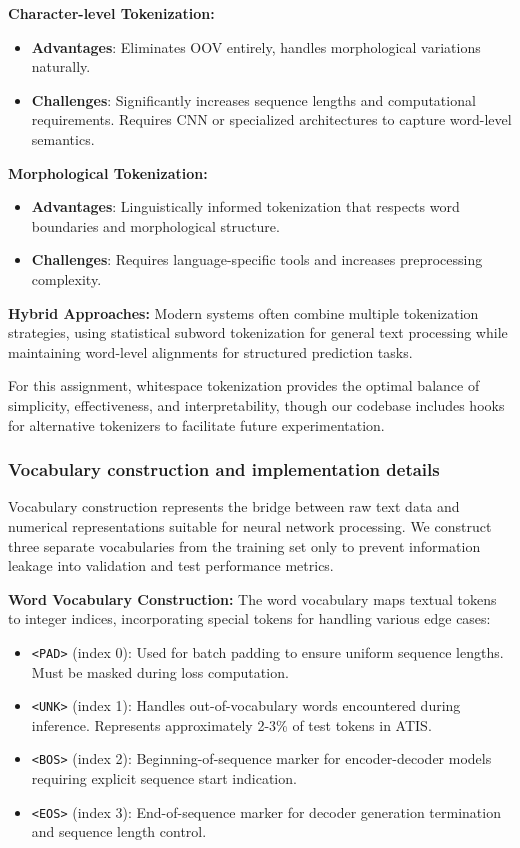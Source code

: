\documentclass[conference]{IEEEtran}
\begin{document}
\textbf{Character-level Tokenization:}
\begin{itemize}
  \item \textbf{Advantages}: Eliminates OOV entirely, handles morphological variations naturally.
  \item \textbf{Challenges}: Significantly increases sequence lengths and computational requirements. Requires CNN or specialized architectures to capture word-level semantics.
\end{itemize}

\textbf{Morphological Tokenization:}
\begin{itemize}
  \item \textbf{Advantages}: Linguistically informed tokenization that respects word boundaries and morphological structure.
  \item \textbf{Challenges}: Requires language-specific tools and increases preprocessing complexity.
\end{itemize}

\textbf{Hybrid Approaches:} Modern systems often combine multiple tokenization strategies, using statistical subword tokenization for general text processing while maintaining word-level alignments for structured prediction tasks.

For this assignment, whitespace tokenization provides the optimal balance of simplicity, effectiveness, and interpretability, though our codebase includes hooks for alternative tokenizers to facilitate future experimentation.

\subsubsection{Vocabulary construction and implementation details}

Vocabulary construction represents the bridge between raw text data and numerical representations suitable for neural network processing. We construct three separate vocabularies from the training set only to prevent information leakage into validation and test performance metrics.

\textbf{Word Vocabulary Construction:}
The word vocabulary maps textual tokens to integer indices, incorporating special tokens for handling various edge cases:
\begin{itemize}
  \item \texttt{<PAD>} (index 0): Used for batch padding to ensure uniform sequence lengths. Must be masked during loss computation.
  \item \texttt{<UNK>} (index 1): Handles out-of-vocabulary words encountered during inference. Represents approximately 2-3\% of test tokens in ATIS.
  \item \texttt{<BOS>} (index 2): Beginning-of-sequence marker for encoder-decoder models requiring explicit sequence start indication.
  \item \texttt{<EOS>} (index 3): End-of-sequence marker for decoder generation termination and sequence length control.
\end{itemize}
\end{document}
